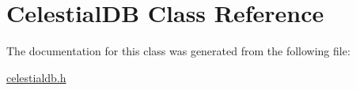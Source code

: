 \hypertarget{structCelestialDB}{}\section{Celestial\+DB Class Reference}
\label{structCelestialDB}


The documentation for this class was generated from the following file\+:\begin{DoxyCompactItemize}
\item 
\mbox{\hyperlink{celestialdb_8h}{celestialdb.\+h}}\end{DoxyCompactItemize}
